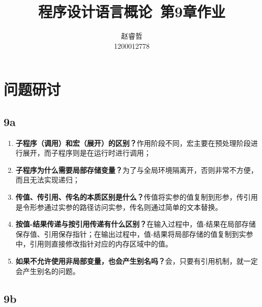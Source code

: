 \documentclass[a4paper,12pt]{article}
\begin{document}
\title{程序设计语言概论\ 第9章作业}
\author{赵睿哲\\1200012778}
\maketitle

\section{问题研讨}

\subsection{9a}

\begin{enumerate}
\item \textbf{子程序（调用）和宏（展开）的区别？}作用阶段不同，宏主要在预处理阶段进行展开，而子程序则是在运行时进行调用；
\item \textbf{子程序为什么需要局部存储变量？}为了与全局环境隔离开，否则非常不方便，而且无法实现递归；
\item \textbf{传值、传引用、传名的本质区别是什么？}传值将实参的值复制到形参，传引用是令形参通过实参的路径访问实参，传名则通过简单的文本替换。
\item\textbf{ 按值-结果传递与按引用传递有什么区别？}在输入过程中，值-结果在局部存储保存值、引用保存指针；在输出过程中，值-结果将局部存储的值复制到实参中，引用则直接修改指针对应的内存区域中的值。
\item \textbf{如果不允许使用非局部变量，也会产生别名吗？}会，只要有引用机制，就一定会产生别名的问题。
\end{enumerate}

\subsection{9b}
\end{document}
